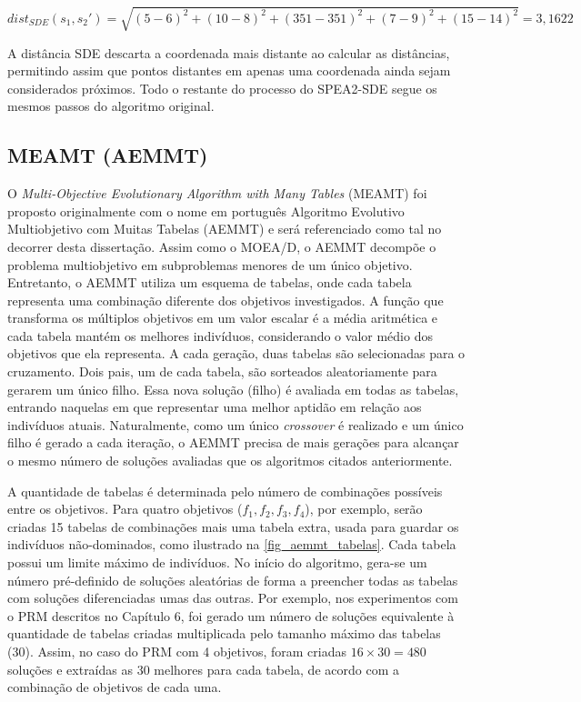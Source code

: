 \begin{equation}dist_{SDE}(s_1, s_2') = \sqrt{(5-6)^2 + (10-8)^2 + (351-351)^2 + (7-9)^2 + (15-14)^2} = 3,1622\end{equation}

A distância SDE descarta a coordenada mais distante ao calcular as distâncias, permitindo assim que pontos distantes em apenas uma coordenada ainda sejam considerados próximos. Todo o restante do processo do SPEA2-SDE segue os mesmos passos do algoritmo original.

\subsection{MEAMT (AEMMT)}

O \textit{Multi-Objective Evolutionary Algorithm with Many Tables} (MEAMT) \cite{Brasil2013} foi proposto originalmente com o nome em português Algoritmo Evolutivo Multiobjetivo com Muitas Tabelas (AEMMT) e será referenciado como tal no decorrer desta dissertação. Assim como o MOEA/D, o AEMMT decompõe o problema multiobjetivo em subproblemas menores de um único objetivo. Entretanto, o AEMMT utiliza um esquema de tabelas, onde cada tabela representa uma combinação diferente dos objetivos investigados. A função que transforma os múltiplos objetivos em um valor escalar é a média aritmética e cada tabela mantém os melhores indivíduos, considerando o valor médio dos objetivos que ela representa. A cada geração, duas tabelas são selecionadas para o cruzamento. Dois pais, um de cada tabela, são sorteados aleatoriamente para gerarem um único filho. Essa nova solução (filho) é avaliada em todas as tabelas, entrando naquelas em que representar uma melhor aptidão em relação aos indivíduos atuais. Naturalmente, como um único \textit{crossover} é realizado e um único filho é gerado a cada iteração, o AEMMT precisa de mais gerações para alcançar o mesmo número de soluções avaliadas que os algoritmos citados anteriormente.

A quantidade de tabelas é determinada pelo número de combinações possíveis entre os objetivos. Para quatro objetivos ($f_1, f_2, f_3, f_4$), por exemplo, serão criadas 15 tabelas de combinações mais uma tabela extra, usada para guardar os indivíduos não-dominados, como ilustrado na \autoref{fig_aemmt_tabelas}. Cada tabela possui um limite máximo de indivíduos. No início do algoritmo, gera-se um número pré-definido de soluções aleatórias de forma a preencher todas as tabelas com soluções diferenciadas umas das outras. Por exemplo, nos experimentos com o PRM descritos no Capítulo 6, foi gerado um número de soluções equivalente à quantidade de tabelas criadas multiplicada pelo tamanho máximo das tabelas (30). Assim, no caso do PRM com 4 objetivos, foram criadas $16 \times 30 = 480$ soluções e extraídas as 30 melhores para cada tabela, de acordo com a combinação de objetivos de cada uma.

